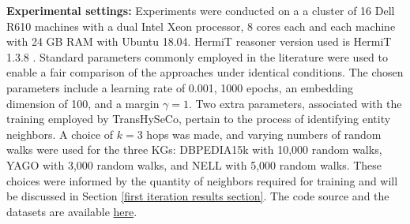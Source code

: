 \documentclass[sigconf]{acmart}
\newcommand{\TransHI}{TransHySeCo\xspace}
\begin{document}
\noindent \textbf{Experimental settings: }
Experiments were conducted on a  %
a cluster of 16 Dell R610 machines  with a dual Intel Xeon processor, 8 cores each and each machine  with 24 GB RAM with Ubuntu 18.04. HermiT reasoner version used is HermiT 1.3.8%
 \cite{hermit}.
Standard parameters commonly employed in the literature \cite{transrowl} were used %
 to enable a fair comparison of the approaches 
 under identical conditions.
 The chosen parameters include a learning rate of 0.001, 1000 epochs, an embedding dimension of 100, and a margin $\gamma=1$. %
Two extra parameters, associated with the training employed by \TransHI, pertain to the process of identifying entity neighbors. A choice of \(k=3\) hops was made, and varying numbers of random walks were used for the three KGs:  DBPEDIA15k with 10,000 random walks, YAGO with 3,000 random walks, and NELL with 5,000 random walks.
These choices were informed by the quantity of neighbors required for training and will be discussed in Section \ref{first iteration results section}. The code source and the datasets are available  \href{https://anonymous.4open.science/r/TransHySeCo-8CE0/}{here}.
\end{document}
